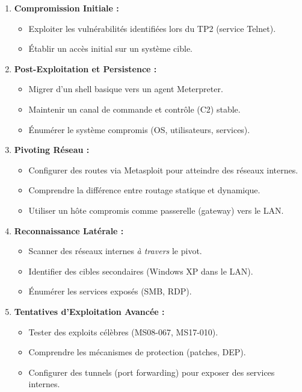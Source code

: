 \documentclass[12pt,a4paper,openany]{report}
\begin{document}
	\begin{enumerate}[leftmargin=*]
		\item \textbf{Compromission Initiale :}
		\begin{itemize}
			\item Exploiter les vulnérabilités identifiées lors du TP2 (service Telnet).
			\item Établir un accès initial sur un système cible.
		\end{itemize}
		
		\item \textbf{Post-Exploitation et Persistence :}
		\begin{itemize}
			\item Migrer d'un shell basique vers un agent Meterpreter.
			\item Maintenir un canal de commande et contrôle (C2) stable.
			\item Énumérer le système compromis (OS, utilisateurs, services).
		\end{itemize}
		
		\item \textbf{Pivoting Réseau :}
		\begin{itemize}
			\item Configurer des routes via Metasploit pour atteindre des réseaux internes.
			\item Comprendre la différence entre routage statique et dynamique.
			\item Utiliser un hôte compromis comme passerelle (gateway) vers le LAN.
		\end{itemize}
		
		\item \textbf{Reconnaissance Latérale :}
		\begin{itemize}
			\item Scanner des réseaux internes \textit{à travers} le pivot.
			\item Identifier des cibles secondaires (Windows XP dans le LAN).
			\item Énumérer les services exposés (SMB, RDP).
		\end{itemize}
		
		\item \textbf{Tentatives d'Exploitation Avancée :}
		\begin{itemize}
			\item Tester des exploits célèbres (MS08-067, MS17-010).
			\item Comprendre les mécanismes de protection (patches, DEP).
			\item Configurer des tunnels (port forwarding) pour exposer des services internes.
		\end{itemize}
		

\end{enumerate}
\end{document}
